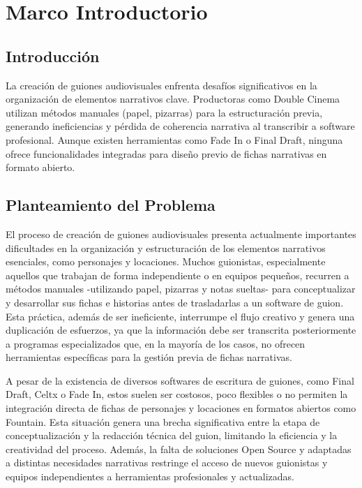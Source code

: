 \documentclass[12pt]{article}
\begin{document}
	\clearpage

	\tableofcontents
	\newpage

	\section{Marco Introductorio}

	\subsection{Introducción}

	La creación de guiones audiovisuales enfrenta desafíos significativos en la organización de elementos narrativos clave. Productoras como Double Cinema utilizan métodos manuales (papel, pizarras) para la estructuración previa, generando ineficiencias y pérdida de coherencia narrativa al transcribir a software profesional. Aunque existen herramientas como Fade In o Final Draft, ninguna ofrece funcionalidades integradas para diseño previo de fichas narrativas en formato abierto.

	\newpage

	\subsection{Planteamiento del Problema}

	El proceso de creación de guiones audiovisuales presenta actualmente importantes dificultades en la organización y estructuración de los elementos narrativos esenciales, como personajes y locaciones. Muchos guionistas, especialmente aquellos que trabajan de forma independiente o en equipos pequeños, recurren a métodos manuales -utilizando papel, pizarras y notas sueltas- para conceptualizar y desarrollar sus fichas e historias antes de trasladarlas a un software de guion. Esta práctica, además de ser ineficiente, interrumpe el flujo creativo y genera una duplicación de esfuerzos, ya que la información debe ser transcrita posteriormente a programas especializados que, en la mayoría de los casos, no ofrecen herramientas específicas para la gestión previa de fichas narrativas.

	A pesar de la existencia de diversos softwares de escritura de guiones, como Final Draft, Celtx o Fade In, estos suelen ser costosos, poco flexibles o no permiten la integración directa de fichas de personajes y locaciones en formatos abiertos como Fountain. Esta situación genera una brecha significativa entre la etapa de conceptualización y la redacción técnica del guion, limitando la eficiencia y la creatividad del proceso. Además, la falta de soluciones Open Source y adaptadas a distintas necesidades narrativas restringe el acceso de nuevos guionistas y equipos independientes a herramientas profesionales y actualizadas.
\end{document}
